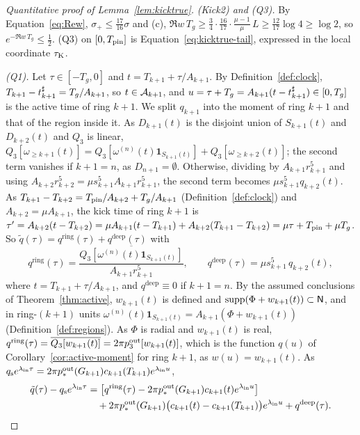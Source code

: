 \begin{proof}[Quantitative proof of Lemma~\ref{lem:kicktrue}]
\emph{(Kick2) and (Q3).} By Equation~\eqref{eq:Rew}, $\sigma_+\le\frac{17}{16}\sigma$
and (c),
$\Re w\,T_g\ge\frac34\cdot\frac{16}{17}\cdot\frac{\mu-1}\mu\,L\ge\frac{12}{17}\log4\ge\log2$,
so $e^{-\Re w\,T_g}\le\frac12$. (Q3) on $[0,T_{\mathrm{pin}}]$ is
Equation~\eqref{eq:kicktrue-tail}, expressed in the local coordinate $\tau_{\mathrm{K}}$.

\emph{(Q1).} Let $\tau\in[-T_g,0]$ and $t=T_{k+1}+\tau/A_{k+1}$. By
Definition~\ref{def:clock}, $T_{k+1}-t^\sharp_{k+1}=T_g/A_{k+1}$, so
$t\in\mathcal{A}_{k+1}$, and $u=\tau+T_g=A_{k+1}(t-t^\sharp_{k+1})\in[0,T_g]$ is the
active time of ring $k+1$.
We split $q_{k+1}$ into the moment of ring $k+1$ and that of the region inside it.
As $D_{k+1}(t)$ is the disjoint union of $S_{k+1}(t)$ and $D_{k+2}(t)$ and $Q_3$ is
linear,
$Q_3[\omega_{\ge k+1}(t)]=Q_3[\omega^{(n)}(t)\mathbf 1_{S_{k+1}(t)}]+Q_3[\omega_{\ge k+2}(t)]$;
the second term vanishes if $k+1=n$, as $D_{n+1}=\emptyset$. Otherwise, dividing by
$A_{k+1}r_{k+1}^5$ and using
$A_{k+2}r_{k+2}^5=\mu s_{k+1}^5A_{k+1}r_{k+1}^5$, the second term
becomes $\mu s_{k+1}^5q_{k+2}(t)$. As $T_{k+1}-T_{k+2}=T_{\mathrm{pin}}/A_{k+2}+T_g/A_{k+1}$
(Definition~\ref{def:clock}) and $A_{k+2}=\mu A_{k+1}$, the kick time of ring $k+1$ is
$\tau'=A_{k+2}(t-T_{k+2})=\mu A_{k+1}(t-T_{k+1})+A_{k+2}(T_{k+1}-T_{k+2})=\mu\tau+T_{\mathrm{pin}}+\mu T_g$.
So $\tilde q(\tau)=q^{\mathrm{ring}}(\tau)+q^{\mathrm{deep}}(\tau)$ with
\[
q^{\mathrm{ring}}(\tau)=\frac{\overline{Q_3[\omega^{(n)}(t)\mathbf 1_{S_{k+1}(t)}]}}{A_{k+1}r_{k+1}^5},\qquad
q^{\mathrm{deep}}(\tau)=\mu s_{k+1}^5\,q_{k+2}(t),
\]
where $t=T_{k+1}+\tau/A_{k+1}$, and
$q^{\mathrm{deep}}\equiv0$ if $k+1=n$.
By the assumed conclusions of Theorem~\ref{thm:active}, $w_{k+1}(t)$ is defined and
$\operatorname{supp}(\Phi+w_{k+1}(t))\subset\mathsf{N}$, and in ring-$(k+1)$ units
$\omega^{(n)}(t)\mathbf 1_{S_{k+1}(t)}=A_{k+1}(\Phi+w_{k+1}(t))$
(Definition~\ref{def:regions}). As $\Phi$ is radial and $w_{k+1}(t)$ is real,
$q^{\mathrm{ring}}(\tau)=\overline{Q_3[w_{k+1}(t)]}=2\pi p^{\mathrm{out}}_3[w_{k+1}(t)]$, which
is the function $q(u)$ of Corollary~\ref{cor:active-moment} for ring $k+1$, as
$w(u)=w_{k+1}(t)$. As $q_{\mathrm{s}} e^{\lambda_{\mathrm{in}}\tau}=2\pi p^{\mathrm{out}}_*(G_{k+1})c_{k+1}(T_{k+1})e^{\lambda_{\mathrm{in}}u}$,
\begin{align*}
\tilde q(\tau)-q_{\mathrm{s}} e^{\lambda_{\mathrm{in}}\tau}&=\big[q^{\mathrm{ring}}(\tau)-2\pi p^{\mathrm{out}}_*(G_{k+1})c_{k+1}(t)e^{\lambda_{\mathrm{in}}u}\big]\\
&\quad+2\pi p^{\mathrm{out}}_*(G_{k+1})\big(c_{k+1}(t)-c_{k+1}(T_{k+1})\big)e^{\lambda_{\mathrm{in}}u}+q^{\mathrm{deep}}(\tau).
\end{align*}

\end{proof}
